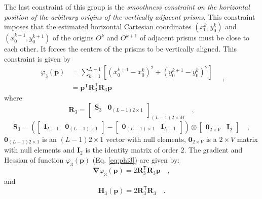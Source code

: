 The last constraint of this group is the \textit{smoothness constraint on the horizontal position of 
the arbitrary origins of the vertically adjacent prisms}. This constraint imposes that the estimated horizontal 
Cartesian coordinates $(x_{0}^{k}, y_{0}^{k})$ and $(x_{0}^{k+1}, y_{0}^{k+1})$ of the origins $O^{k}$ and $O^{k+1}$ 
of adjacent prisms must be close to each other. It forces the centers of the prisms to be vertically aligned. This constraint 
is given by
\begin{equation}\label{eq:phi3}
\begin{split}
\varphi_{3}(\mathbf{p}) &= \sum\limits^{L-1}_{k=1}\left[\left(x_{0}^{k+1} - x_{0}^{k}\right)^2 + \left(y_{0}^{k+1} - y_{0}^{k}\right)^2 \right] \\
&= \mathbf{p}^{\mathsf{T}} \mathbf{R}^{\mathsf{T}}_{3}\mathbf{R}_{3}\mathbf{p}
\end{split} \quad ,
\end{equation}
where 
\begin{equation}
\mathbf{R}_{3} = 
\begin{bmatrix}
\mathbf{S}_{3} & \mathbf{0}_{(L-1)2 \times 1} \\
\end{bmatrix}_{(L-1)2 \times M} \quad ,
\label{eq:R3-matrix}
\end{equation}
\begin{equation}
\mathbf{S}_{3} =
\left( 
\begin{bmatrix} \mathbf{I}_{L-1} & \mathbf{0}_{(L-1) \times 1} \end{bmatrix} -
\begin{bmatrix} \mathbf{0}_{(L-1) \times 1} & \mathbf{I}_{L-1} \end{bmatrix} 
\right) \otimes 
\begin{bmatrix} \mathbf{0}_{2 \times V} & \mathbf{I}_{2} \end{bmatrix} \quad ,
\label{eq:S3-matrix}
\end{equation}
$\mathbf{0}_{(L-1)2 \times 1}$ is an $(L-1)2 \times 1$ vector with null elements,
$\mathbf{0}_{2 \times V}$ is a $2 \times V$ matrix with null elements and 
$\mathbf{I}_{2}$ is the identity matrix of order $2$. The gradient and Hessian of function $\varphi_{3}(\mathbf{p})$ (Eq. \ref{eq:phi3}) are given by:
\begin{equation}\label{eq:phi3_grad}
\boldsymbol{\nabla}\varphi_{3}(\mathbf{p}) = 2 \mathbf{R}^{\mathsf{T}}_{3}\mathbf{R}_{3}\mathbf{p} \quad ,
\end{equation}
and
\begin{equation}\label{eq:phi3_hessian}
\mathbf{H}_{3}(\mathbf{p}) = 2 \mathbf{R}^{\mathsf{T}}_{3}\mathbf{R}_{3} \quad .
\end{equation}


